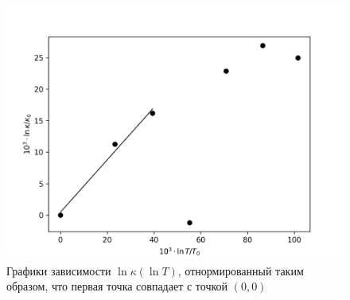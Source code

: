 \documentclass[14pt, a4paper]{report}
\begin{document}
\begin{figure}[!ht]
\centering
\includegraphics[scale=0.6]{terma6_3.png}
\caption{Графики зависимости $\ln\kappa(\ln T)$, отнормированный таким образом, что первая точка совпадает с точкой $(0, 0)$}
\end{figure}
\end{document}

